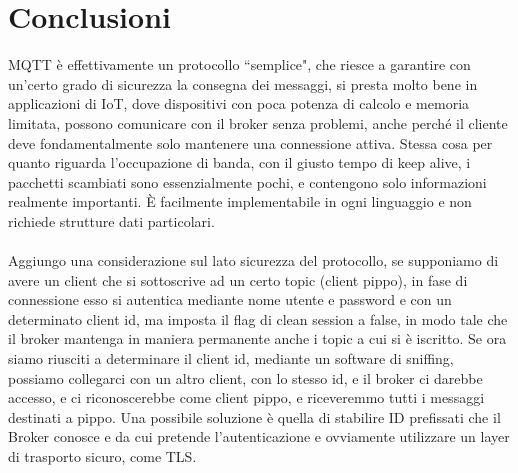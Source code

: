 \documentclass{article}
\begin{document}
\section{Conclusioni}
MQTT è effettivamente un protocollo ``semplice", che riesce a garantire con un'certo grado di sicurezza la consegna dei messaggi, si presta molto bene in applicazioni di IoT, dove dispositivi con poca potenza di calcolo e memoria limitata, possono comunicare con il broker senza problemi, anche perché il cliente deve fondamentalmente solo mantenere una connessione attiva. Stessa cosa per quanto riguarda l'occupazione di banda, con il giusto tempo di keep alive, i pacchetti scambiati sono essenzialmente pochi, e contengono solo informazioni realmente importanti. È facilmente implementabile in ogni linguaggio e non richiede strutture dati particolari.\\\\Aggiungo una considerazione sul lato sicurezza del protocollo, se supponiamo di avere un client che si sottoscrive ad un certo topic (client pippo), in fase di connessione esso si autentica mediante nome utente e password e con un determinato client id, ma imposta il flag di clean session a false, in modo tale che il broker mantenga in maniera permanente anche i topic a cui si è iscritto. Se ora siamo riusciti a determinare il client id, mediante un software di sniffing, possiamo collegarci con un altro client, con lo stesso id, e il broker ci darebbe accesso, e ci riconoscerebbe come client pippo, e riceveremmo tutti i messaggi destinati a pippo. Una possibile soluzione è quella di stabilire ID prefissati che il Broker conosce e da cui pretende l'autenticazione e ovviamente utilizzare un layer di trasporto sicuro, come TLS.
\end{document}
